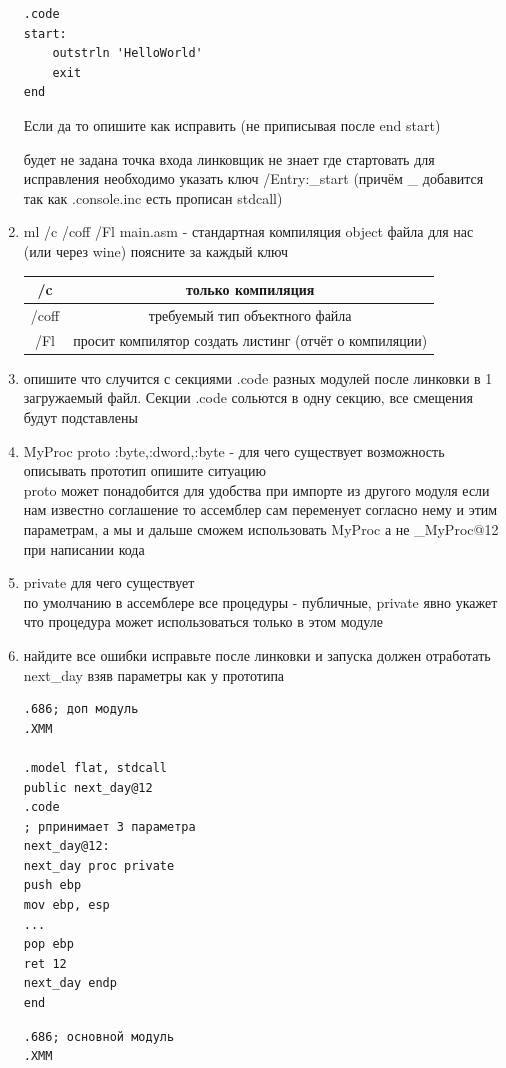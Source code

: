 \documentclass[a4paper,10pt]{article}
\begin{document}
\begin{enumerate}
\begin{verbatim}
.code
start: 
    outstrln 'HelloWorld'
    exit
end
\end{verbatim}
    Если да то опишите как исправить (не приписывая после end start) \par
    будет не задана точка входа линковщик не знает где стартовать для исправления необходимо указать ключ /Entry:\_start (причём \_ добавится так как .console.inc есть прописан stdcall)
    \item ml /c /coff /Fl main.asm - стандартная компиляция object файла для нас (или через wine) поясните за каждый ключ \\
    \begin{tabular*}{15cm}{c|c}
        \hline
        /c &  только компиляция \\
        \hline
        /coff & требуемый тип объектного файла \\
        \hline
        /Fl & просит компилятор создать листинг (отчёт о компиляции)\\
        \hline
    \end{tabular*}
    \item опишите что случится с секциями .code разных модулей после линковки в 1 загружаемый файл.
Секции .code сольются в одну секцию, все смещения будут подставлены\\
    \item MyProc proto :byte,:dword,:byte - для чего существует возможность описывать прототип опишите ситуацию \\
proto может понадобится для удобства при импорте из другого модуля если нам известно соглашение то ассемблер сам переменует согласно нему и этим параметрам, а мы и дальше сможем использовать MyProc а не \_MyProc@12 при написании кода \\
    \item private для чего существует \\
по умолчанию в ассемблере все процедуры - публичные, private явно укажет что процедура может использоваться только в этом модуле
    \item найдите все ошибки исправьте после линковки и запуска должен отработать next\_day взяв параметры как у прототипа
\begin{verbatim}
.686; доп модуль
.XMM

.model flat, stdcall
public next_day@12
.code
; рпринимает 3 параметра
next_day@12:
next_day proc private
push ebp
mov ebp, esp
...
pop ebp
ret 12
next_day endp
end
\end{verbatim}


\begin{verbatim}
.686; основной модуль
.XMM


\end{verbatim}
\end{enumerate}
\end{document}
